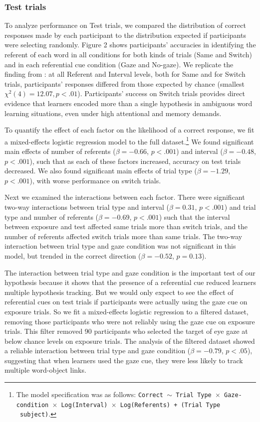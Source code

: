 \documentclass[10pt,letterpaper]{article}
\begin{document}
\subsubsection{Test trials}

To analyze performance on Test trials, we compared the distribution of correct responses made by each participant to the distribution expected if participants were selecting randomly. Figure 2 shows participants' accuracies in identifying the referent of each word in all conditions for both kinds of trials (Same and Switch) and in each referential cue condition (Gaze and No-gaze). We replicate the finding from : at all Referent and Interval levels, both for Same and for Switch trials, participants' responses differed from those expected by chance (smallest $\chi^{2}(4) = 12.07, p < .01$). Participants' success on Switch trials provides direct evidence that learners encoded more than a single hypothesis in ambiguous word learning situations, even under high attentional and memory demands. 

To quantify the effect of each factor on the likelihood of a correct response, we fit a mixed-effects logistic regression model to the full dataset.\footnote{The model specification was as follows: \texttt{Correct $\sim$ Trial Type~$\times$~Gaze-condition~$\times$~Log(Interval)~$\times$~Log(Referents) + (Trial Type \textbar~subject)}.} We found significant main effects of number of referents ($\beta= -0.66$, $p< .001$) and interval ($\beta= -0.48$, $p< .001$), such that as each of these factors increased, accuracy on test trials decreased. We also found significant main effects of trial type ($\beta= -1.29$, $p< .001$), with worse performance on switch trials. 

Next we examined the interactions between each factor. There were significant two-way interactions between trial type and interval ($\beta= 0.31$, $p< .001$) and trial type and number of referents ($\beta=-0.69$, $p< .001$) such that the interval between exposure and test affected same trials more than switch trials, and the number of referents affected switch trials more than same trials. The two-way interaction between trial type and gaze condition was not significant in this model, but trended in the correct direction ($\beta= -0.52$, $p=0.13$). 

The interaction between trial type and gaze condition is the important test of our hypothesis because it shows that the presence of a referential cue reduced learners multiple hypothesis tracking. But we would only expect to see the effect of referential cues on test trials if participants were actually using the gaze cue on exposure trials. So we fit a mixed-effects logistic regression to a filtered dataset, removing those participants who were not reliably using the gaze cue on exposure trials. This filter removed 90 participants who selected the target of eye gaze at below chance levels on exposure trials. The analysis of the filtered dataset showed a reliable interaction between trial type and gaze condition ($\beta= -0.79$, $p< .05$), suggesting that when learners used the gaze cue, they were less likely to track multiple word-object links.
\end{document}
